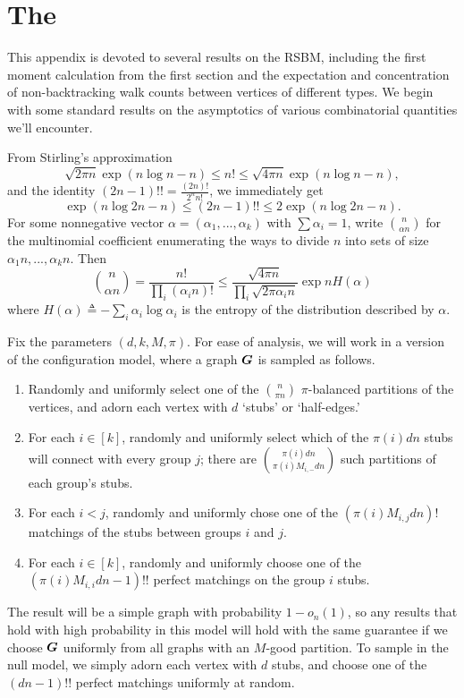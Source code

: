 \section{The \fullmodel}
\label{sec:model}

This appendix is devoted to several results on the RSBM, including the first moment calculation from the first section and the expectation and concentration of non-backtracking walk counts between vertices of different types. We begin with some standard results on the asymptotics of various combinatorial quantities we'll encounter. 

From Stirling's approximation
$$
    \sqrt{2\pi n}\exp(n\log n - n) \le n! \le \sqrt{4\pi n}\exp(n\log n - n),
$$
and the identity $(2n-1)!! = \tfrac{(2n)!}{2^n n!}$, we immediately get
$$
    \exp(n\log 2n - n) \le (2n - 1)!! \le 2\exp(n\log 2n - n).
$$
For some nonnegative vector $\alpha = (\alpha_1,...,\alpha_k)$ with $\sum\alpha_i = 1$, write ${n \choose \alpha n}$ for the multinomial coefficient enumerating the ways to divide $n$ into sets of size $\alpha_1 n,...,\alpha_k n$. Then
$$
    {n \choose \alpha n} = \frac{n!}{\prod_i (\alpha_i n)!} \le \frac{\sqrt{4\pi n}}{\prod_i \sqrt{2\pi \alpha_i n}} \exp n H(\alpha)
$$
where $H(\alpha) \triangleq -\sum_i \alpha_i \log \alpha_i$ is the entropy of the distribution described by $\alpha$.

Fix the parameters $(d,k,M,\pi)$. For ease of analysis, we will work in a version of the configuration model, where a graph $\boldsymbol{G}$ is sampled as follows.
\begin{enumerate}
    \item Randomly and uniformly select one of the ${n\choose \pi n}$ $\pi$-balanced partitions of the vertices, and adorn each vertex with $d$ `stubs' or `half-edges.'
    \item For each $i \in [k]$, randomly and uniformly select which of the $\pi(i)dn$ stubs will connect with every group $j$; there are ${\pi(i)dn \choose \pi(i)M_{i,-} dn}$ such partitions of each group's stubs.
    \item For each $i<j$, randomly and uniformly chose one of the $(\pi(i)M_{i,j}dn)!$ matchings of the stubs between groups $i$ and $j$.
    \item For each $i\in[k]$, randomly and uniformly choose one of the $(\pi(i)M_{i,i}dn-1)!!$ perfect matchings on the group $i$ stubs.
\end{enumerate}
The result will be a simple graph with probability $1- o_n(1)$, so any results that hold with high probability in this model will hold with the same guarantee if we choose $\boldsymbol{G}$ uniformly from all graphs with an $M$-good partition. To sample in the null model, we simply adorn each vertex with $d$ stubs, and choose one of the $(dn-1)!!$ perfect matchings uniformly at random.

